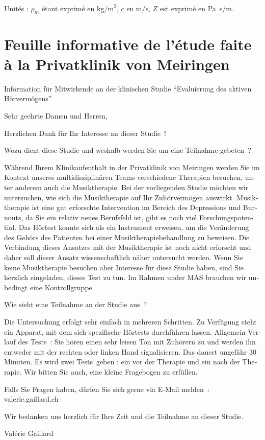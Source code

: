 Unités : $\rho_{m}$ étant exprimé en \si{kg/m\cubed},
$c$ en \si{m/s}, $Z$ est
exprimé en \si{\pascal . s/m}.

\chapter{Feuille informative de l'étude faite à la Privatklinik von Meiringen}

\begin{german}

Information für Mitwirkende an der klinischen Studie
\foreignquote{german}{Evaluierung des aktiven Hörvermögens}


Sehr geehrte Damen und Herren,

Herzlichen Dank für Ihr Interesse an dieser Studie !

Wozu dient diese Studie und weshalb werden Sie um eine Teilnahme gebeten ?

Während Ihrem Klinikaufenthalt  in der Privatklinik von Meiringen werden Sie im Kontext 
unseres multidisziplinären Teams verschiedene Therapien besuchen, unter anderem auch die Musiktherapie. Bei der vorliegenden Studie möchten wir untersuchen, wie sich die Musiktherapie auf Ihr Zuhörvermögen auswirkt.
Musiktherapie ist eine gut erforschte Intervention im Bereich des Depressions und Burnouts, da Sie ein relativ neues Berufsfeld ist, gibt es noch viel Forschungspotential.
Das Hörtest konnte sich als ein Instrument erweisen, um die Veränderung des Gehörs des Patienten bei einer Musiktherapiebehandlung zu beweisen. Die Verbindung dieses Ansatzes mit der Musiktherapie ist noch nicht erforscht und daher soll dieser Ansatz wissenschaftlich näher untersucht werden.
Wenn Sie keine Musiktherapie besuchen aber Interesse für diese Studie haben, sind Sie herzlich eingeladen, dieses Test zu tun. Im Rahmen under MAS brauchen wir unbedingt eine Kontrollgruppe.

Wie sieht eine Teilnahme an der Studie aus ?

Die Untersuchung erfolgt sehr einfach in mehreren Schritten.
Zu Verfügung steht ein Apparat, mit dem sich spezifische Hörtests durchführen lassen.
Allgemein Verlauf des Tests :  
Sie hören einen sehr leisen Ton mit Zuhörern zu und werden ihn entweder mit der rechten  oder linken Hand  signalisieren. Das dauert ungefähr 30 Minuten.
Es wird zwei Tests geben : ein vor der Therapie und ein nach der Therapie.
Wir bitten Sie auch, eine kleine Fragebogen zu erfüllen.


Falls Sie Fragen haben, dürfen Sie sich gerne via E-Mail melden : valerie.gaillard\@gmx.ch

Wir bedanken uns herzlich für Ihre Zeit und die Teilnahme an dieser Studie.

\end{german}
Valérie Gaillard


